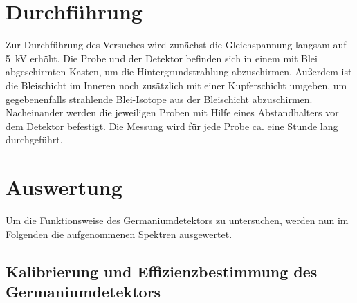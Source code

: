 \section{Durchführung}
Zur Durchführung des Versuches wird zunächst die Gleichspannung langsam auf \SI{5}{\kilo\volt}
erhöht.
Die Probe und der Detektor befinden sich in einem mit Blei abgeschirmten Kasten,
um die Hintergrundstrahlung abzuschirmen. Außerdem ist die Bleischicht im Inneren
noch zusätzlich mit einer Kupferschicht umgeben, um gegebenenfalls strahlende
Blei-Isotope aus der Bleischicht abzuschirmen.
Nacheinander werden die jeweiligen Proben mit Hilfe eines Abstandhalters
vor dem Detektor befestigt. Die Messung wird für jede Probe ca. eine Stunde lang
durchgeführt.

\section{Auswertung}
Um die Funktionsweise des Germaniumdetektors zu untersuchen, werden nun im Folgenden die aufgenommenen
Spektren ausgewertet.

\subsection{Kalibrierung und Effizienzbestimmung des Germaniumdetektors}

